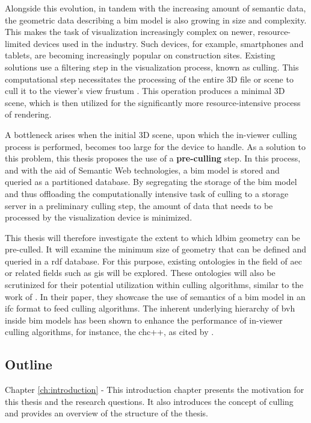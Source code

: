 \begin{refsection}
\begin{multicols}{2}
        Alongside this evolution, in tandem with the increasing amount of semantic data, the geometric data describing a \ac{bim} model is also growing in size and complexity. This makes the task of visualization increasingly complex on newer, resource-limited devices used in the industry. Such devices, for example, smartphones and tablets, are becoming increasingly popular on construction sites. Existing solutions use a filtering step in the visualization process, known as culling. This computational step necessitates the processing of the entire 3D file or scene to cull it to the viewer's view frustum \parencite{Johansson2015}. This operation produces a minimal 3D scene, which is then utilized for the significantly more resource-intensive process of rendering.

        A bottleneck arises when the initial 3D scene, upon which the in-viewer culling process is performed, becomes too large for the device to handle. As a solution to this problem, this thesis proposes the use of a \textbf{pre-culling} step. In this process, and with the aid of Semantic Web technologies, a \ac{bim} model is stored and queried as a partitioned database. By segregating the storage of the \ac{bim} model and thus offloading the computationally intensive task of culling to a storage server in a preliminary culling step, the amount of data that needs to be processed by the visualization device is minimized.

        This thesis will therefore investigate the extent to which \ac{ldbim} geometry can be pre-culled. It will examine the minimum size of geometry that can be defined and queried in a \ac{rdf} database. For this purpose, existing ontologies in the field of \ac{aec} or related fields such as \ac{gis} will be explored. These ontologies will also be scrutinized for their potential utilization within culling algorithms, similar to the work of \cite{Johansson2009}. In their paper, they showcase the use of semantics of a \ac{bim} model in an \ac{ifc} format to feed culling algorithms. The inherent underlying hierarchy of \ac{bvh} inside \ac{bim} models has been shown to enhance the performance of in-viewer culling algorithms, for instance, the \ac{chc}++, as cited by \parencite{Johansson2015}.

        \subsection*{Outline}
        \textsf{Chapter \ref{ch:introduction} -}
        This introduction chapter presents the motivation for this thesis and the research questions. It also introduces the concept of culling and provides an overview of the structure of the thesis.


\end{multicols}
\end{refsection}
